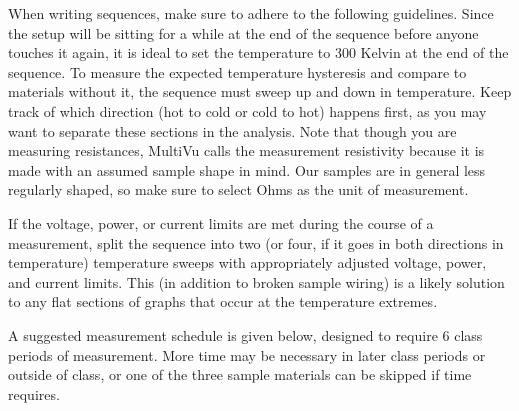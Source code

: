 \documentclass{article}
\begin{document}
When writing sequences, make sure to adhere to the following guidelines. Since the setup will be sitting for a while at the end of the sequence before anyone touches it again, it is ideal to set the temperature to 300 Kelvin at the end of the sequence. To measure the expected temperature hysteresis and compare to materials without it, the sequence must sweep up and down in temperature. Keep track of which direction (hot to cold or cold to hot) happens first, as you may want to separate these sections in the analysis. Note that though you are measuring resistances, MultiVu calls the measurement resistivity because it is made with an assumed sample shape in mind. Our samples are in general less regularly shaped, so make sure to select Ohms as the unit of measurement.

If the voltage, power, or current limits are met during the course of a measurement, split the sequence into two (or four, if it goes in both directions in temperature) temperature sweeps with appropriately adjusted voltage, power, and current limits. This (in addition to broken sample wiring) is a likely solution to any flat sections of graphs that occur at the temperature extremes.

A suggested measurement schedule is given below, designed to require 6 class periods of measurement. More time may be necessary in later class periods or outside of class, or one of the three sample materials can be skipped if time requires.
\end{document}
